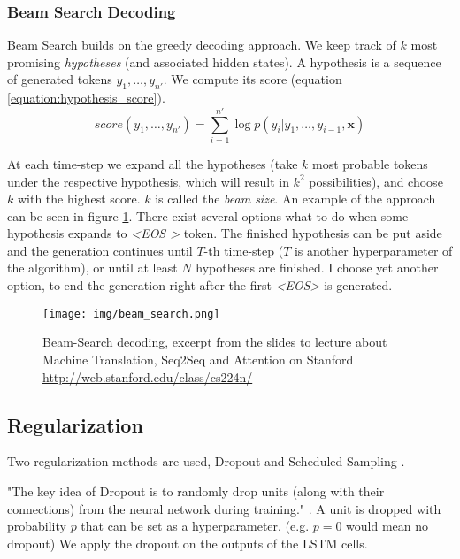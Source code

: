 \subsubsection{Beam Search Decoding}

Beam Search builds on the greedy decoding approach. We keep track of $k$ most promising \emph{hypotheses} (and associated hidden states). A hypothesis is a sequence of generated tokens $y_1,\dots,y_{n'}$. We compute its score (equation \ref{equation:hypothesis_score}).
\begin{equation} \label{equation:hypothesis_score}
    score(y_1,\dots,y_{n'}) = \sum_{i=1}^{n'}{\log{p(y_i | y_1, \dots, y_{i-1}, \boldsymbol{x})}}
\end{equation}

At each time-step we expand all the hypotheses (take $k$ most probable tokens under the respective hypothesis, which will result in $k^2$ possibilities), and choose $k$ with the highest score. $k$ is called the \emph{beam size}. An example of the approach can be seen in figure \ref{figure:beam_search}. There exist several options what to do when some hypothesis expands to \emph{\textless EOS \textgreater} token. The finished hypothesis can be put aside and the generation continues until $T$-th time-step ($T$ is another hyperparameter of the algorithm), or until at least $N$ hypotheses are finished. I choose yet another option, to end the generation right after the first \emph{\textless EOS\textgreater} is generated.

\begin{figure}[!h]
    \centering
    \texttt{[image: img/beam\_search.png]}
    \caption{\centering Beam-Search decoding, excerpt from the slides to lecture about Machine Translation, Seq2Seq and Attention on Stanford \url{http://web.stanford.edu/class/cs224n/}} \label{figure:beam_search}
\end{figure}

\subsection{Regularization}

Two regularization methods are used, Dropout and Scheduled Sampling \citep{bengio2015scheduled}.

"The key idea of Dropout is to randomly drop units (along with their connections) from the neural network during training." \citep{srivastavaDropout2014}. A unit is dropped with probability $p$ that can be set as a hyperparameter. (e.g. $p = 0$ would mean no dropout)  We apply the dropout on the outputs of the LSTM cells.

